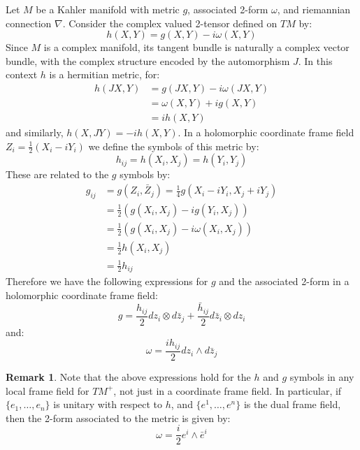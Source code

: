 \documentclass[11pt]{amsart}
\theoremstyle{definition}
\newtheorem{remark}[subsection]{Remark}
\begin{document}
Let $M$ be a Kahler manifold with metric $g$, associated 2-form $\omega$, and riemannian connection $\nabla$.  Consider the complex valued 2-tensor defined on $TM$ by:
%
$$ h(X,Y) = g(X,Y) - i \omega(X,Y) $$
%
Since $M$ is a complex manifold, its tangent bundle is naturally a complex vector bundle, with the complex structure encoded by the automorphism $J$.  In this context $h$ is a hermitian metric, for:
%
\begin{align*}
h(JX,Y) &= g(JX,Y) - i \omega( JX, Y ) \\
&= \omega( X, Y ) + i g( X, Y ) \\
&= i h(X,Y)
\end{align*}
%
and similarly, $ h(X,JY) = - ih(X,Y) $.  In a holomorphic coordinate frame field $Z_i = \frac{1}{2}(X_i - i Y_i)$ we define the symbols of this metric by:
%
$$h_{ij} = h( X_i, X_j ) = h( Y_i, Y_j )$$
%
These are related to the $g$ symbols by:
%
\begin{align*}
g_{ij} &= g( Z_i, \bar{Z}_j ) = \frac{1}{4}g( X_i - i Y_i, X_j + i Y_j ) \\
&= \frac{1}{2}( g(X_i, X_j) - i g( Y_i, X_j ) ) \\
&= \frac{1}{2}( g(X_i, X_j) - i \omega( X_i, X_j ) ) \\
&= \frac{1}{2} h( X_i, X_j ) \\
&= \frac{1}{2} h_{ij}
\end{align*}
%
Therefore we have the following expressions for $g$ and the associated 2-form in a holomorphic coordinate frame field:
%
$$ g = \frac{ h_{ij} }{2}  d z_i \otimes d \bar{z}_j + \frac{ \bar{h}_{ij} }{2} d \bar{z}_i \otimes d z_i  $$
%
and:
%
$$ \omega = \frac{i h_{ij} }{2} d z_i \wedge d \bar{z}_j $$

\begin{remark}  Note that the above expressions hold for the $h$ and $g$ symbols in any local frame field for $TM^{+}$, not just in a coordinate frame field.  In particular, if $\{ e_1, \ldots, e_n \}$ is unitary with respect to $h$, and $ \{ e^1, \ldots, e^n \} $ is the dual frame field, then the 2-form associated to the metric is given by:
%
$$ \omega = \frac{i}{2} e^i \wedge \bar{e}^i $$
%
\end{remark}
\end{document}
